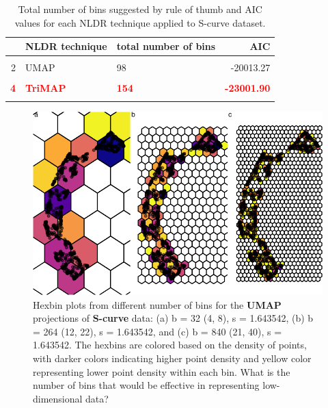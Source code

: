 \documentclass[
  12pt]{article}
\begin{document}
\begin{table}[H]
\centering
\begin{tabular}{rllr}
  \hline
\textbf{} & \textbf{NLDR technique} & \textbf{total number of bins} & \textbf{AIC }\\ 
  \hline
\cellcolor{gray!6}{1} & \cellcolor{gray!6}{tSNE} & \cellcolor{gray!6}{72} & \cellcolor{gray!6}{-21882.46 }\\ 
  2 & UMAP & 98 & -20013.27 \\ 
\cellcolor{gray!6}{  3} & \cellcolor{gray!6}{PHATE} & \cellcolor{gray!6}{90} & \cellcolor{gray!6}{-15036.91 }\\ 
\textcolor{red}{\textbf{  4}} & \textcolor{red}{\textbf{TriMAP}} & \textcolor{red}{\textbf{154}} & \textcolor{red}{\textbf{-23001.90 }}\\ 
\cellcolor{gray!6}{  5} & \cellcolor{gray!6}{PaCMAP} & \cellcolor{gray!6}{132} & \cellcolor{gray!6}{-21330.06 }\\ 
   \hline
\end{tabular}
\caption{Total number of bins suggested by rule of thumb and AIC values for each NLDR technique applied to S-curve dataset.} 
\label{tbl-msebinsnldr}
\end{table}

\begin{figure}[H]

{\centering \includegraphics{paper_files/figure-pdf/fig-binsize-1.pdf}

}

\caption{\label{fig-binsize}Hexbin plots from different number of bins
for the \textbf{UMAP} projections of \textbf{S-curve} data: (a) b = 32
(4, 8), s = 1.643542, (b) b = 264 (12, 22), s = 1.643542, and (c) b =
840 (21, 40), s = 1.643542. The hexbins are colored based on the density
of points, with darker colors indicating higher point density and yellow
color representing lower point density within each bin. What is the
number of bins that would be effective in representing low-dimensional
data?}

\end{figure}
\end{document}
